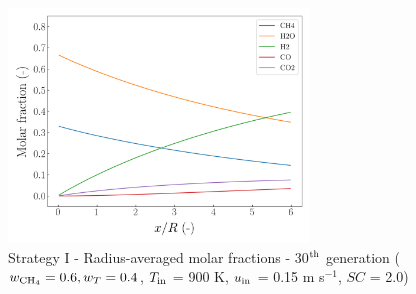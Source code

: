 \documentclass[preprint,12pt]{elsarticle}
\begin{document}
\begin{figure}[h!]
\centering
\includegraphics[width=80mm]{results/5/60C_40T/GEN30-AVG.png}
\caption{\label{fig:5R6040G30-avg} Strategy I - Radius-averaged molar fractions -  30$^{\rm{th}}$ generation ($w_{\rm{CH_4}} = 0.6, w_T = 0.4$, $T_{\rm{in}}$ = 900 K, $u_{\rm{in}}$ = 0.15 m s$^{-1}$, $SC$ = 2.0)}
\end{figure}
\end{document}
